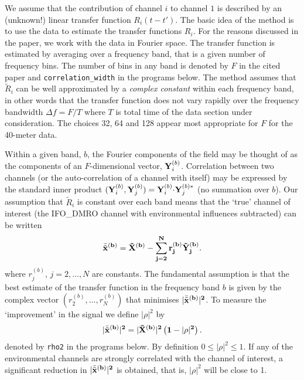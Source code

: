 We assume that the contribution of channel $i$ to channel $1$ is
described by an (unknown!) linear transfer function $R_i(t-t')$. The
basic idea of the method is to use the data to estimate the transfer
functions $R_i$.  For the reasons discussed in the paper, we work
with the data in Fourier space.  The transfer function is estimated by
averaging over a frequency band, that is a given number of frequency
bins.  The number of bins in any band is  denoted by $F$ in
the cited paper and {\tt correlation\_width} in
the programs below.  The method assumes that $\tilde R_i$ can be well
approximated by a {\it complex constant} within each frequency band,
in other words that the transfer function
does not vary rapidly over the frequency bandwidth $\Delta f = F/T$
where $T$ is total time of the data section under consideration.
The choices 32, 64 and 128 appear most appropriate for $F$ for the
40-meter data. 

Within a given band, $b$, the Fourier components of the field may be thought
of as the components of an $F$-dimensional vector, ${\bf Y}_i^{(b)}$.    
Correlation between two channels (or the auto-correlation of
a channel with itself) may be expressed by the standard inner product
$({\bf Y}_i^{(b)},{\bf Y}_j^{(b)}) = {\bf Y}_i^{(b)}{\cdot}{\bf
  Y}_j^{(b)*}$ (no summation over $b$). Our assumption that $\tilde R_i$
is constant over each band means that the `true' channel of interest
(the IFO\_DMRO channel with environmental influences subtracted) can
be written
\begin{equation}
\bar {\tilde {\bf x}}^{(b)} =  {\tilde {\bf X}}^{(b)} - \sum_{j=2}^N
r^{(b)}_j {\tilde {\bf Y}_j}^{(b)}.
\end{equation}
where $r^{(b)}_j$, $j=2,\dots,N$ are constants.
The fundamental assumption is that the best estimate of the transfer
function in the frequency band $b$ is given by the complex vector 
$(r^{(b)}_2,\dots,r^{(b)}_N)$ that minimises 
$|\bar {\tilde {\bf x}}^{(b)}|^2$.
To measure the `improvement' in the signal we define $|\rho|^2$ by
\begin{equation}
 |\bar {\tilde {\bf x}}^{(b)}|^2 = | {\tilde {\bf X}}^{(b)}|^2 
      \left( 1 - |\rho|^2 \right) .
\end{equation}
denoted by {\tt rho2} in the programs below.
By definition $0 \leq |\rho|^2 \leq 1$.
If any of the  environmental channels are strongly correlated
with the channel of interest, a significant reduction in  
$|\bar {\tilde {\bf x}}^{(b)}|^2$ is
obtained, that is, $|\rho|^2$ will be close to 1.

